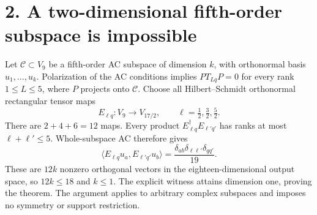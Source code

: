 \documentclass[11pt]{article}
\begin{document}
\section*{2. A two-dimensional fifth-order subspace is impossible}
Let $\mathcal C\subset V_9$ be a fifth-order AC subspace of dimension $k$,
with orthonormal basis $u_1,\ldots,u_k$. Polarization of the AC conditions
implies $P T_{Lq}P=0$ for every rank $1\le L\le5$, where $P$ projects onto
$\mathcal C$.
Choose all Hilbert--Schmidt orthonormal rectangular tensor maps
\[
 E_{\ell q}:V_9\longrightarrow V_{17/2},
 \qquad \ell=\tfrac12,\tfrac32,\tfrac52.
\]
There are $2+4+6=12$ maps. Every product $E_{\ell q}^{\dagger}E_{\ell' q'}$
has ranks at most $\ell+\ell'\le5$. Whole-subspace AC therefore gives
\[
 \langle E_{\ell q}u_a,E_{\ell' q'}u_b\rangle
 =\frac{\delta_{ab}\delta_{\ell\ell'}\delta_{qq'}}{19}.
\]
These are $12k$ nonzero orthogonal vectors in the eighteen-dimensional
output space, so $12k\le18$ and $k\le1$. The explicit witness attains
dimension one, proving the theorem. The argument applies to arbitrary
complex subspaces and imposes no symmetry or support restriction.
\end{document}
